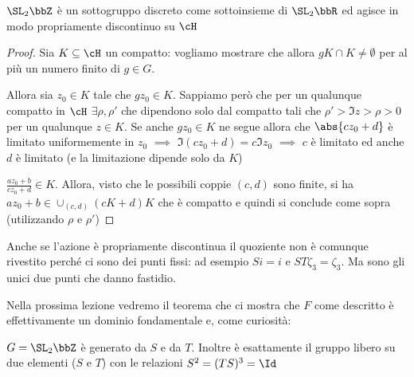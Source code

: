 \begin{lemma}
  $\SL_2 \bbZ$ è un sottogruppo discreto come sottoinsieme di $\SL_2 \bbR$
  ed agisce in modo propriamente discontinuo su $\cH$
\end{lemma}
\begin{proof}
  Sia $K \subseteq \cH$ un compatto: vogliamo mostrare che allora
  $gK \cap K \neq \emptyset$ per al più un numero finito di $g \in G$.

  Allora sia $z_0 \in K$ tale che $g z_0 \in K$. Sappiamo però che per
  un qualunque compatto in $\cH$ $\exists \rho, \rho'$ che dipendono
  solo dal compatto tali che $\rho' > \Im z > \rho > 0$ per un qualunque
  $z \in K$. Se anche $g z_0 \in K$ ne segue allora che $\abs{cz_0 + d}$
  è limitato uniformemente in $z_0$ $\implies$
  $\Im (cz_0 + d) = c \Im z_0$ $\implies$ $c$ è limitato ed anche $d$ è
  limitato (e la limitazione dipende solo da $K$)

  $\frac{a z_0 + b}{c z_0 + d} \in K$. Allora, visto che le possibili
  coppie $(c, d)$ sono finite, si ha
  $a z_0 + b \in \cup_{(c, d)} (cK + d)K$ che è compatto e quindi si
  conclude come sopra (utilizzando $\rho$ e $\rho'$)
\end{proof}

Anche se l'azione è propriamente discontinua il quoziente non è comunque
rivestito perché ci sono dei punti fissi: ad esempio $Si = i$ e $ST
\zeta_3 = \zeta_3$. Ma sono gli unici due punti che danno fastidio.


Nella prossima lezione vedremo il teorema che ci mostra che $F$ come
descritto è effettivamente un dominio fondamentale e, come curiosità:
\begin{teorema}
  $G = \SL_2 \bbZ$ è generato da $S$ e da $T$. Inoltre è esattamente il
  gruppo libero su due elementi ($S$ e $T$) con le relazioni
  $S^2 = (TS)^3 = \Id$
\end{teorema}

